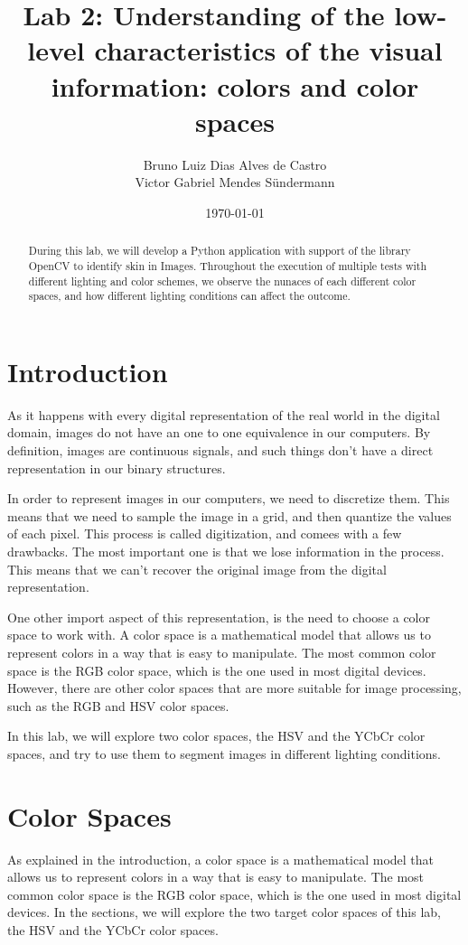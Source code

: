 \documentclass[journal]{IEEEtran}
\title{Lab 2: Understanding of the low-level characteristics of the visual information: colors and color spaces}
\author{Bruno Luiz Dias Alves de Castro \\ Victor Gabriel Mendes Sündermann}
\date{\today}
\begin{document}
\maketitle

\begin{abstract}
During this lab, we will develop a Python application with support of the library OpenCV to identify skin in Images. Throughout the execution of multiple tests with different lighting and color schemes, we observe the nunaces of each different color spaces, and how different lighting conditions can affect the outcome.
 \end{abstract}

\section{Introduction}
As it happens with every digital representation of the real world in the digital domain, images do not have an one to one equivalence in our computers. By definition, images are continuous signals, and such things don't have a direct representation in our binary structures.

In order to represent images in our computers, we need to discretize them. This means that we need to sample the image in a grid, and then quantize the values of each pixel. This process is called digitization, and comees with a few drawbacks. The most important one is that we lose information in the process. This means that we can't recover the original image from the digital representation.

One other import aspect of this representation, is the need to choose a color space to work with. A color space is a mathematical model that allows us to represent colors in a way that is easy to manipulate. The most common color space is the RGB color space, which is the one used in most digital devices. However, there are other color spaces that are more suitable for image processing, such as the RGB and HSV color spaces.

In this lab, we will explore two color spaces, the HSV and the YCbCr color spaces, and try to use them to segment images in different lighting conditions.

\section{Color Spaces}

As explained in the introduction, a color space is a mathematical model that allows us to represent colors in a way that is easy to manipulate. The most common color space is the RGB color space, which is the one used in most digital devices. In the sections, we will explore the two target color spaces of this lab, the HSV and the YCbCr color spaces.
\end{document}

